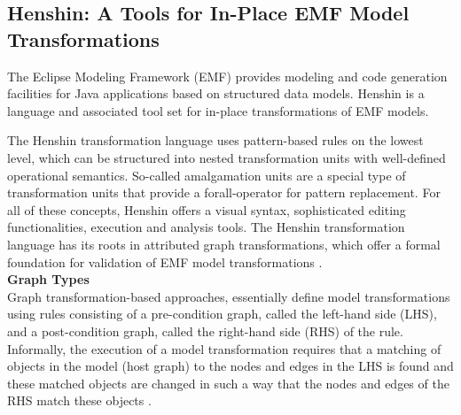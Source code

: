 \subsection{Henshin: A Tools for In-Place EMF Model Transformations}\label{henshin}
The Eclipse Modeling Framework (EMF) provides modeling and code generation facilities for Java applications based on structured data models. Henshin is a language and associated tool set for in-place transformations of EMF models. 

The Henshin transformation language uses pattern-based rules on the lowest level, which can be structured into nested transformation units with well-deﬁned operational semantics. So-called amalgamation units are a special type of transformation units that provide a forall-operator for pattern replacement. For all of these concepts, Henshin oﬀers a visual syntax, sophisticated editing functionalities, execution and analysis tools. The Henshin transformation language has its roots in attributed graph transformations, which oﬀer a formal foundation for validation of EMF model transformations \cite{arendt2010henshin}. \\ 
\textbf{Graph Types}\\ 
Graph transformation-based approaches, essentially deﬁne model transformations using rules consisting of a pre-condition graph, called the left-hand side (LHS), and a post-condition graph, called the right-hand side (RHS) of the rule. Informally, the execution of a model transformation requires that a matching of objects in the model (host graph) to the nodes and edges in the LHS is found and these matched objects are changed in such a way that the nodes and edges of the RHS match these objects \cite{tichy2013detecting}.

